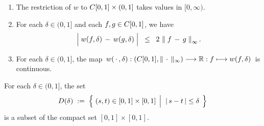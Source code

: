 \begin{proposition}
\mbox{}\vskip 0cm
\begin{enumerate}
\item	The restriction of $w$ to $C[0,1] \times (0,1]$ takes values in $[0,\infty)$.
\item	For each $\delta \in (0,1]$ and each $f, g \in C[0,1]$, we have
		\begin{equation*}
		\left\vert\;\overset{{\color{white}:}}{w}(f,\delta) \,-\, w(g,\delta)\;\right\vert
		\;\; \leq \;\;
		2\,\left\Vert\; f \,-\, g \;\right\Vert_{\infty}.
		\end{equation*}
\item	For each $\delta \in (0,1]$, the map
		\,$w(\,\cdot\,,\delta) : \left(C[0,1],\Vert\,\cdot\,\Vert_{\infty}\right) \longrightarrow \mathbb{R} :  f \longmapsto w(f,\delta)$\,
		is continuous.
\end{enumerate}
\end{proposition}
\proof
\vskip 0.1cm
\noindent
For each $\delta \in (0,1]$, the set
\begin{equation*}
	D(\delta)
	\; := \;
	\left\{\;
		(s,t) \in [0,1] \times [0,1]
		\;\left\vert\;\;
		\vert\,s - t\,\vert \leq \overset{{\color{white}.}}{\delta}
	\right.
\;\right\}
\end{equation*}
is a subset of the compact set $[0,1] \times [0,1]$.		
